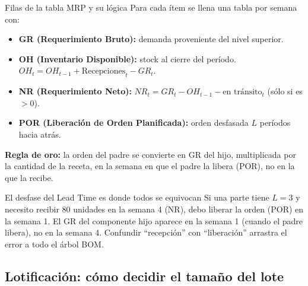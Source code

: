 \begin{formulas}{Filas de la tabla MRP y su lógica}
   Para cada ítem se llena una tabla por semana con:
   \begin{itemize}
     \item \textbf{GR (Requerimiento Bruto):} demanda proveniente del nivel superior.
     \item \textbf{OH (Inventario Disponible):} stock al cierre del período. $OH_t = OH_{t-1} + \text{Recepciones}_t - GR_t$.
     \item \textbf{NR (Requerimiento Neto):} $NR_t = GR_t - OH_{t-1} - \text{en tránsito}_t$ (sólo si es $> 0$).
     \item \textbf{POR (Liberación de Orden Planificada):} orden desfasada $L$ períodos hacia atrás.
   \end{itemize}
   \textbf{Regla de oro:} la orden del padre se convierte en GR del hijo, multiplicada por la cantidad de la receta, en la semana en que el padre la libera (POR), no en la que la recibe.
\end{formulas}

\begin{trampa}{El desfase del Lead Time es donde todos se equivocan}
   Si una parte tiene $L = 3$ y necesito recibir 80 unidades en la semana 4 (NR), debo liberar la orden (POR) en la semana 1. El GR del componente hijo aparece en la semana 1 (cuando el padre libera), no en la semana 4. Confundir ``recepción'' con ``liberación'' arrastra el error a todo el árbol BOM.
\end{trampa}

\subsection{Lotificación: cómo decidir el tamaño del lote}

